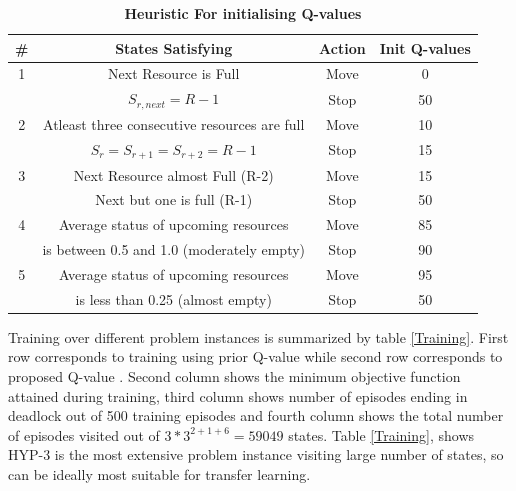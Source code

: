 \begin{table}[H]
    \centering
    \caption{\textbf{Heuristic For initialising Q-values}}
    \label{Heuristic}
    \begin{tabular}{ c c c c  } 
     \hline
     \textbf{\#} & \textbf{States Satisfying} & \textbf{Action} & \textbf{Init Q-values} \\ 
     \hline
     \hline
    1 & Next Resource is Full & Move & 0 \\
     & $ S_{r,next} = R-1 $ & Stop & 50\\
    
     2 & Atleast three consecutive resources are full & Move & 10 \\
     & $ S_r = S_{r+1} = S_{r+2} = R-1 $   & Stop & 15\\
    
     3 & Next Resource almost Full (R-2) & Move & 15 \\
     & Next but one is full (R-1) & Stop & 50 \\
    
     4 & Average status of upcoming resources & Move & 85 \\
     & is between 0.5 and 1.0 (moderately empty) & Stop & 90\\
     
     5 & Average status of upcoming resources & Move & 95 \\
      & is less than 0.25 (almost empty)  & Stop & 50\\
     \hline

    \end{tabular}
\end{table}

Training over different problem instances is summarized by table \ref{Training}. First row corresponds to training 
using prior Q-value while second row corresponds to proposed Q-value .  Second column shows the
minimum objective function attained during training, third column shows number of episodes ending 
in deadlock out of 500 training episodes and fourth column shows the total number of 
episodes visited out of $3 * 3^{2 + 1 + 6}  = 59049$ states. Table \ref{Training}, shows HYP-3 is the most extensive problem 
instance visiting large number of states, so can be ideally most suitable for transfer learning.

